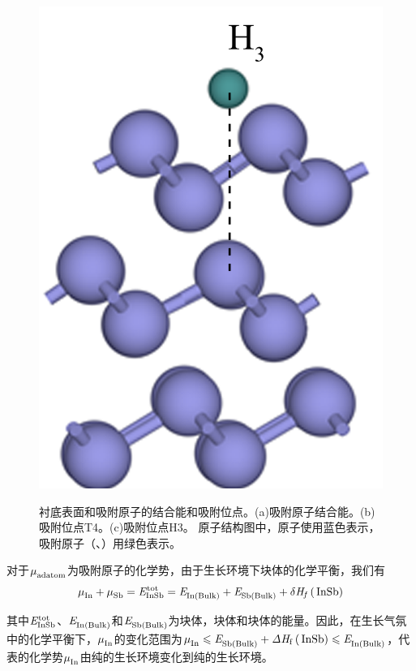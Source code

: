 \begin{figure}[htb]
{        \includegraphics[trim={0, -20, 0 0},clip]{pic/IS_structure_H3onBi.png}
    }
    \caption{衬底表面和吸附原子的结合能和吸附位点。(a)吸附原子结合能。(b)吸附位点T4。(c)吸附位点H3。 原子结构图中，原子使用蓝色表示，吸附原子（、）用绿色表示。}
    \label{fig:IS_Bi_adatoms}
\end{figure}

对于$\it \mu_{\rm adatom}^{\rm } \it$为吸附原子的化学势，由于生长环境下块体的化学平衡，我们有\chinesecolon
\[
    \muVar{In}{}+\muVar{Sb}{}=\energyVar{InSb}{tot}=\energyVar{In\left(Bulk\right)}{}+\energyVar{Sb\left(Bulk\right)}{}+\delta H_{f}\left(\cemb{InSb}\right)
\]

其中$\it E_{\rm InSb}^{\rm tot} \it$、$\it E_{\rm In\left(Bulk\right)}^{\rm } \it$和$\it E_{\rm Sb\left(Bulk\right)}^{\rm } \it$为块体，块体和块体的能量。因此，在生长气氛中的化学平衡下，$\it \mu_{\rm In}^{\rm } \it$的变化范围为$\muVar{In}{}\leqslant \energyVar{Sb\left(Bulk\right)}{}+\Delta H_{\rm f}\left(\cemb{InSb}\right) \leqslant \energyVar{In\left(Bulk\right)}{}$，代表的化学势$\it \mu_{\rm In}^{\rm } \it$由纯的生长环境变化到纯的生长环境。
 
